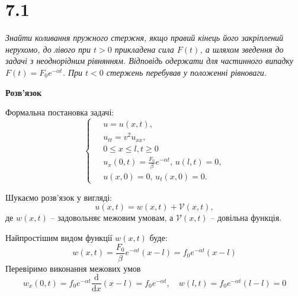 

%



\section[Задача №7.1]{7.1}

\textit{Знайти коливання пружного стержня, якщо правий кінець його закріплений нерухомо, до лівого при $t > 0$ прикладена сила $F(t)$, а шляхом зведення до задачі з неоднорідним рівнянням. Відповідь одержати для частинного випадку $F(t) = F_0 e^{-\alpha t}$. При $t < 0$ стержень перебував у положенні рівноваги.} 

\begin{center}
    \large{\textbf{Розв'язок}}
\end{center}

\noindent Формальна постановка задачі:
\begin{equation} %
    \left\{ \begin{aligned} %
            \;&u = u(x,t), \\
            &u_{tt} = v^2 u_{xx}, \\
            &0 \leq x \leq l, t \geq 0 \\
            &u_x(0,t) = \frac{F_0}{\beta} e^{-\alpha t}, \, u(l,t) = 0, \\
            &u(x,0) = 0, \, u_t(x,0) = 0.
    \end{aligned} \right.
\end{equation}

Шукаємо розв'язок у вигляді:
\begin{equation} %
    u(x,t) = w(x,t) + \mathcal{V}(x,t),
\end{equation}
де $w(x,t)$ -- задовольняє межовим умовам, а $\mathcal{V}(x,t)$ -- довільна функція.

Найпростішим видом функції $w(x,t)$ буде:
\begin{equation}
    w(x,t) = \frac{F_0}{\beta} e^{-\alpha t} (x - l) = f_0 e^{-\alpha t} (x - l)
\end{equation}
Перевіримо виконання межових умов
\begin{equation*}
    w_x(0,t) = f_0 e^{-\alpha t} \frac{\mathrm{d}}{\mathrm{d}x} (x - l) = f_0 e^{-\alpha t}, \quad w(l,t) = f_0 e^{-\alpha t} (l - l) = 0
\end{equation*}

